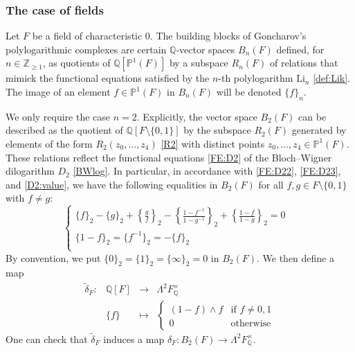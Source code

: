 \documentclass[11pt,a4,leqno]{amsart}
\theoremstyle{my theoremstyle}
\theoremstyle{dfn}
\theoremstyle{remark}
\renewcommand{\1}{\mathbbm{1}}
\newcommand{\Z}{\mathbb{Z}}
\newcommand{\Q}{\mathbb{Q}}
\numberwithin{equation}{section}
\begin{document}
\subsubsection{The case of fields}

Let $F$ be a field of characteristic $0$. The building blocks of Goncharov's polylogarithmic complexes are certain $\Q$-vector spaces $B_n(F)$ defined, for $n\in \Z_{\geq 1}$, as quotients of $\Q[\mathbb{P}^1(F)]$ by a subspace $R_n(F)$ of relations that mimick the functional equations satisfied by the $n$-th polylogarithm $\mathrm{Li}_n$ \eqref{def:Lik}. The image of an element $f\in \mathbb{P}^1(F)$ in $B_n(F)$ will be denoted $\{ f \}_n$. 

We only require the case $n=2$. Explicitly, the vector space $B_2(F)$ can be described as the quotient of $\Q[F\setminus \{ 0,1 \}]$ by the subspace $R_2(F)$ generated by elements of the form 
$
R_2(z_0, \ldots, z_4)
$
\eqref{R2} with distinct points $z_0, \ldots, z_4 \in \mathbb{P}^1(F)$. These relations reflect the functional equations \eqref{FE:D2} of the Bloch--Wigner dilogarithm $D_2$ \eqref{BWlog}. In particular, in accordance with \eqref{FE:D22}, \eqref{FE:D23}, and \eqref{D2:value}, we have the following equalities in $B_2(F)$ for all $f,g \in F\setminus \{ 0,1 \}$ with $f\neq g$:
\begin{equation}\label{relationsB2}
\begin{cases}
    \{ f \}_2- \{ g \}_2+\left\{\frac{g}{f}\right\}_2-\left\{\frac{1-f^{-1}}{1-g^{-1}}\right\}_2+\left\{\frac{1-f}{1-g}\right\}_2=0 & \\
    \{1-f\}_2=\{f^{-1}\}_2=-\{f\}_2 & \\
\end{cases}
\end{equation}
By convention, we put $\{ 0 \}_2=\{ 1 \}_2=\{ \infty \}_2=0$ in $B_2(F)$. We then define a map
\begin{equation*}
\begin{array}{cccc}
    \tilde{\delta}_F \colon & \Q[F] & \longrightarrow & \Lambda^2 F_{\Q}^\times  \\
     & \{ f \} &  \longmapsto & \begin{cases} (1-f)\wedge f & \textrm{if } f \neq 0, 1 \\
     0 & \textrm{otherwise}
     \end{cases}
\end{array}
\end{equation*}
One can check that $\tilde{\delta}_F$ induces a map $\delta_F \colon B_2(F) \to \Lambda^2 F_{\Q}^\times$.
\end{document}
